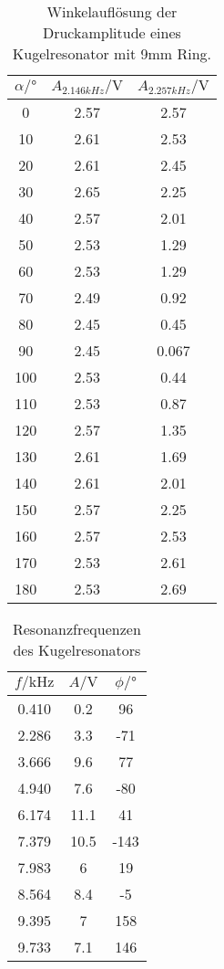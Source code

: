 \begin{table}
    \centering
    \caption{Winkelauflösung der Druckamplitude eines Kugelresonator mit 9mm Ring.}
    \label{tab:kugel_ring}
    \begin{tabular}{c c c}
        \toprule
        $\alpha/°$ & $A_{2.146kHz}/\si{\volt}$ & $A_{2.257kHz}/\si{\volt}$\\
        \midrule
        0   &2.57    &2.57\\
        10  &2.61    &2.53\\
        20  &2.61    &2.45\\
        30  &2.65    &2.25\\
        40  &2.57    &2.01\\
        50  &2.53    &1.29\\
        60  &2.53    &1.29\\
        70  &2.49    &0.92\\
        80  &2.45    &0.45\\
        90  &2.45    &0.067\\
        100 &2.53    &0.44\\
        110 &2.53    &0.87\\
        120 &2.57    &1.35\\
        130 &2.61    &1.69\\
        140 &2.61    &2.01\\
        150 &2.57    &2.25\\
        160 &2.57    &2.53\\
        170 &2.53    &2.61\\
        180 &2.53    &2.69\\
        \bottomrule
    \end{tabular}
\end{table}

\begin{table}
    \centering
    \caption{Resonanzfrequenzen des Kugelresonators}
    \label{tab:kugel_resonanz}
    \begin{tabular}{c c c}
        \toprule
        $f/\si{\kilo\hertz}$ & $A/\si{\volt}$ & $\phi/°$\\
        \midrule
        0.410   &0.2     &96\\
        2.286   &3.3     &-71\\
        3.666   &9.6     &77\\
        4.940   &7.6     &-80\\
        6.174   &11.1    &41\\
        7.379   &10.5    &-143\\
        7.983   &6       &19\\
        8.564   &8.4     &-5\\
        9.395   &7       &158\\
        9.733   &7.1     &146\\
        \bottomrule
    \end{tabular}
\end{table}

